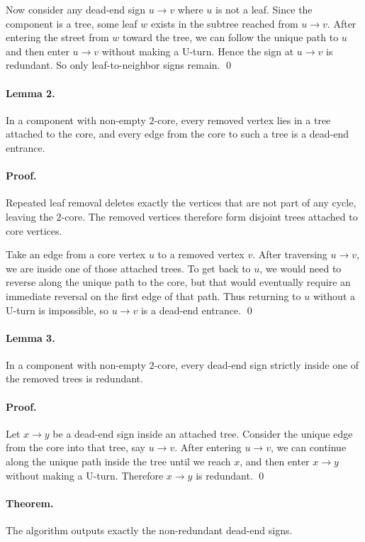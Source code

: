 \documentclass[11pt]{article}
\begin{document}
Now consider any dead-end sign $u \to v$ where $u$ is not a leaf. Since the component is a tree, some leaf $w$ exists in the subtree reached from $u \to v$. After entering the street from $w$ toward the tree, we can follow the unique path to $u$ and then enter $u \to v$ without making a U-turn. Hence the sign at $u \to v$ is redundant. So only leaf-to-neighbor signs remain. \qed

\paragraph{Lemma 2.}
In a component with non-empty $2$-core, every removed vertex lies in a tree attached to the core, and every edge from the core to such a tree is a dead-end entrance.

\paragraph{Proof.}
Repeated leaf removal deletes exactly the vertices that are not part of any cycle, leaving the $2$-core. The removed vertices therefore form disjoint trees attached to core vertices.

Take an edge from a core vertex $u$ to a removed vertex $v$. After traversing $u \to v$, we are inside one of those attached trees. To get back to $u$, we would need to reverse along the unique path to the core, but that would eventually require an immediate reversal on the first edge of that path. Thus returning to $u$ without a U-turn is impossible, so $u \to v$ is a dead-end entrance. \qed

\paragraph{Lemma 3.}
In a component with non-empty $2$-core, every dead-end sign strictly inside one of the removed trees is redundant.

\paragraph{Proof.}
Let $x \to y$ be a dead-end sign inside an attached tree. Consider the unique edge from the core into that tree, say $u \to v$. After entering $u \to v$, we can continue along the unique path inside the tree until we reach $x$, and then enter $x \to y$ without making a U-turn. Therefore $x \to y$ is redundant. \qed

\paragraph{Theorem.}
The algorithm outputs exactly the non-redundant dead-end signs.
\end{document}
